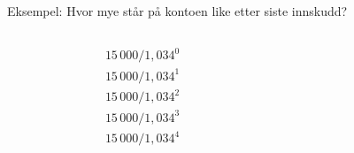 \begin{frame}[t]{Eksempel: Hvor mye står på kontoen like etter siste innskudd?}
\begin{center}
\end{center}
\begin{columns}[T,onlytextwidth]
  \begin{column}{0.10\textwidth}
    \begin{align*}
      &15\,000 / 1,034^0\\
      &15\,000 / 1,034^1\\
      &15\,000 / 1,034^2\\
      &15\,000 / 1,034^3\\
      &15\,000 / 1,034^4
    \end{align*}
  \end{column}
   \begin{column}{0.90\textwidth}
\end{column}
\end{columns}
\end{frame}

